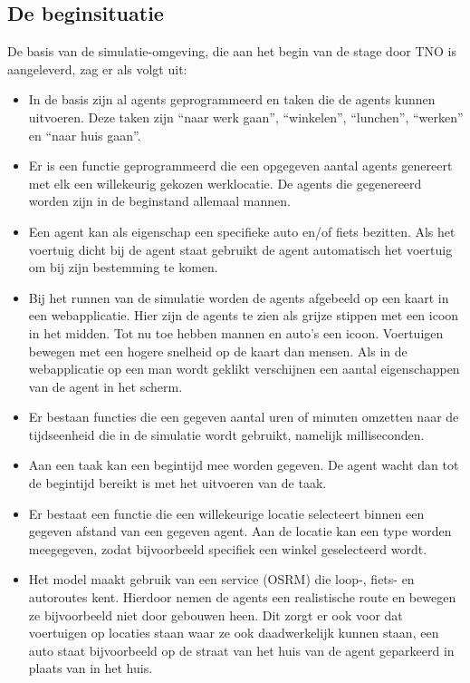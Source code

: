 \documentclass[12pt, letterpaper]{article}
\begin{document}
\subsection{De beginsituatie}
De basis van de simulatie-omgeving, die aan het begin van de stage door TNO is aangeleverd, zag er als volgt uit:
\begin{itemize}
    \item In de basis zijn al agents geprogrammeerd en taken die de agents kunnen uitvoeren. Deze taken zijn “naar werk gaan”, “winkelen”, “lunchen”, “werken” en “naar huis gaan”. 
    \item Er is een functie geprogrammeerd die een opgegeven aantal agents genereert met elk een willekeurig gekozen werklocatie. De agents die gegenereerd worden zijn in de beginstand allemaal mannen.
    \item Een agent kan als eigenschap een specifieke auto en/of fiets bezitten. Als het voertuig dicht bij de agent staat gebruikt de agent automatisch het voertuig om bij zijn bestemming te komen.
    \item Bij het runnen van de simulatie worden de agents afgebeeld op een kaart in een webapplicatie. Hier zijn de agents te zien als grijze stippen met een icoon in het midden. Tot nu toe hebben mannen en auto’s een icoon. Voertuigen bewegen met een hogere snelheid op de kaart dan mensen. Als in de webapplicatie op een man wordt geklikt verschijnen een aantal eigenschappen van de agent in het scherm.
    \item Er bestaan functies die een gegeven aantal uren of minuten omzetten naar de tijdseenheid die in de simulatie wordt gebruikt, namelijk milliseconden.
    \item Aan een taak kan een begintijd mee worden gegeven. De agent wacht dan tot de begintijd bereikt is met het uitvoeren van de taak.
    \item Er bestaat een functie die een willekeurige locatie selecteert binnen een gegeven afstand van een gegeven agent. Aan de locatie kan een type worden meegegeven, zodat bijvoorbeeld specifiek een winkel geselecteerd wordt.
    
    \item Het model maakt gebruik van een service (OSRM) die loop-, fiets- en autoroutes kent. Hierdoor nemen de agents een realistische route en bewegen ze bijvoorbeeld niet door gebouwen heen. Dit zorgt er ook voor dat voertuigen op locaties staan waar ze ook daadwerkelijk kunnen staan, een auto staat bijvoorbeeld op de straat van het huis van de agent geparkeerd in plaats van in het huis. 
\end{itemize}
\end{document}
